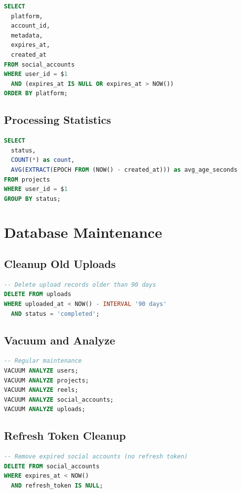 \begin{lstlisting}[language=SQL]
SELECT 
  platform,
  account_id,
  metadata,
  expires_at,
  created_at
FROM social_accounts
WHERE user_id = $1
  AND (expires_at IS NULL OR expires_at > NOW())
ORDER BY platform;
\end{lstlisting}

\subsection{Processing Statistics}

\begin{lstlisting}[language=SQL]
SELECT 
  status,
  COUNT(*) as count,
  AVG(EXTRACT(EPOCH FROM (NOW() - created_at))) as avg_age_seconds
FROM projects
WHERE user_id = $1
GROUP BY status;
\end{lstlisting}

\section{Database Maintenance}

\subsection{Cleanup Old Uploads}

\begin{lstlisting}[language=SQL]
-- Delete upload records older than 90 days
DELETE FROM uploads
WHERE uploaded_at < NOW() - INTERVAL '90 days'
  AND status = 'completed';
\end{lstlisting}

\subsection{Vacuum and Analyze}

\begin{lstlisting}[language=SQL]
-- Regular maintenance
VACUUM ANALYZE users;
VACUUM ANALYZE projects;
VACUUM ANALYZE reels;
VACUUM ANALYZE social_accounts;
VACUUM ANALYZE uploads;
\end{lstlisting}

\subsection{Refresh Token Cleanup}

\begin{lstlisting}[language=SQL]
-- Remove expired social accounts (no refresh token)
DELETE FROM social_accounts
WHERE expires_at < NOW()
  AND refresh_token IS NULL;
\end{lstlisting}

